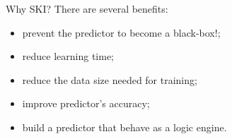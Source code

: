 \documentclass[presentation]{beamer}\mode<presentation>{\usetheme{AMSBolognaFC}}
\begin{document}

            
            
            
            
                        
            
            



\begin{frame}[c]{Why SKI?}
    There are several benefits:
    \begin{itemize}
        \item prevent the predictor to become a black-box\alert{!};
        \item reduce learning time;
        \item reduce the data size needed for training;
        \item improve predictor's accuracy;
        \item build a predictor that behave as a logic engine.
    \end{itemize}
\end{frame}
\end{document}
